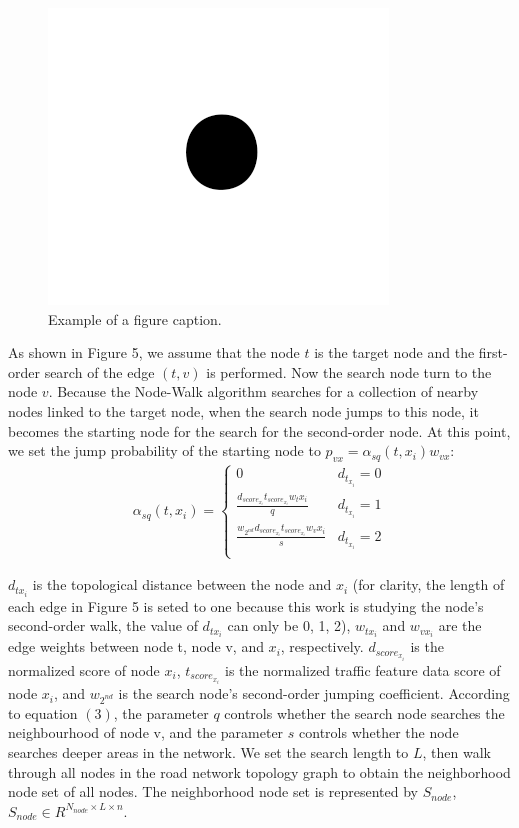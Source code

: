 \documentclass[conference]{IEEEtran}
\begin{document}
\begin{figure}[htbp]
\centerline{\includegraphics{fig1.png}}
\caption{Example of a figure caption.}
\label{fig}
\end{figure}

\par
As shown in Figure 5, we assume that the node $t$ is the target node and the first-order search of the edge $(t,v)$ is performed. Now the search node turn to the node $v$. Because the Node-Walk algorithm searches for a collection of nearby nodes linked to the target node, when the search node jumps to this node, it becomes the starting node for the search for the second-order node. At this point, we set the jump probability of the starting node to $p_{vx} = \alpha _{sq}(t,x_i)w_{vx}$:
\begin{eqnarray}
    \alpha _{sq}(t,x_i) =
    \begin{cases}
    0  &  d_{t_{x_i}} = 0 \\    
    \frac{d_{score_{x_i}}t_{score_{x_i}}w_t{x_i}}{q} & d_{t_{x_i}} = 1 \\
    \frac{w_{2^{nd}}d_{score_{x_i}}t_{score_{x_i}}w_v{x_i}}{s}  & d_{t_{x_i}} = 2 \\
    \end{cases}
\end{eqnarray}  

\par
$d_{tx_i}$ is the topological distance between the node and $x_i$ (for clarity, the length of each edge in Figure 5 is seted to one because this work is studying the node's second-order walk, the value of $d_{tx_i}$ can only be 0, 1, 2), $w_{tx_i}$ and $w_{vx_i}$ are the edge weights between node t, node v, and $x_i$, respectively. $d_{score_{x_i}}$ is the normalized score of node $x_i$, $t_{score_{x_i}}$ is the normalized traffic feature data score of node $x_i$, and $w_{2^{nd}}$ is the search node's second-order jumping coefficient. According to equation $(3)$, the parameter $q$ controls whether the search node searches the neighbourhood of node v, and the parameter $s$ controls whether the node searches deeper areas in the network.
We set the search length to $L$, then walk through all nodes in the road network topology graph to obtain the neighborhood node set of all nodes. The neighborhood node set is represented by $S_{node}$, $S_{node}\in R^{N_{node}\times L\times n}$.
\end{document}

